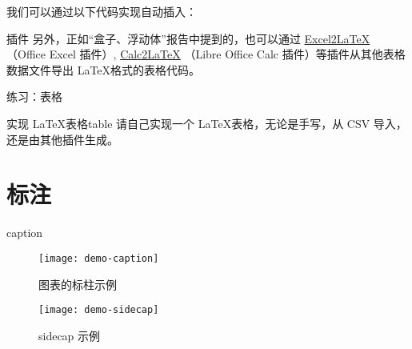 \documentclass[final]{ctexbeamer}
\begin{document}
\begin{frame}[fragile]
我们可以通过以下代码实现自动插入：
\begin{sidelst}

\end{sidelst}
\end{frame}


\begin{frame}{插件}
另外，正如“盒子、浮动体”报告中提到的，也可以通过 \href{https://github.com/krlmlr/Excel2LaTeX}{Excel2LaTeX} （Office Excel 插件）, \href{http://calc2latex.sourceforge.net/}{Calc2LaTeX} （Libre Office Calc 插件）等插件从其他表格数据文件导出 \LaTeX 格式的表格代码。
\end{frame}


\begin{frame}[fragile]{练习：表格}
\begin{Ex}{实现 \LaTeX 表格}{table}
请自己实现一个 \LaTeX 表格，无论是手写，从 CSV 导入，还是由其他插件生成。
\end{Ex}
\end{frame}



\section{标注}
% 
\begin{frame}[fragile]{caption}
\end{frame}


\begin{frame}
\begin{figure}[]
  \centering
  \texttt{[image: demo-caption]}
  \caption{图表的标柱示例}
  \label{demo-caption}
\end{figure}
\end{frame}


\begin{frame}[fragile]
\end{frame}

\captionsetup[figure]{name=边注图}

\begin{frame}
\begin{figure}[]
  \centering
  \texttt{[image: demo-sidecap]}
  \caption{sidecap 示例}
  \label{demo-sidecap}
\end{figure}
\end{frame}
\end{document}
